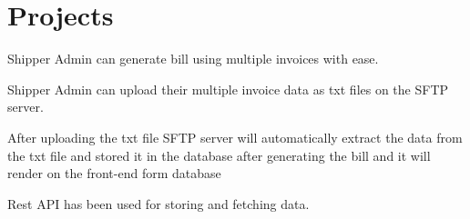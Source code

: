 \documentclass[]{deedy-resume-openfont}
\begin{document}
\begin{minipage}[t]{0.56\textwidth}

\vspace{5pt}
\section{Projects}
\begin{tightemize}
\item Shipper Admin can generate bill using multiple invoices with ease.
\end{tightemize}

\sectionsep
\begin{tightemize}
\item Shipper Admin can upload their multiple invoice data as txt files on the SFTP server.
\item After uploading the txt file SFTP server will automatically extract the data from the txt file and stored it in the database after generating the bill and it will render on the front-end form database
\item Rest API has been used for storing and fetching data.
\end{tightemize}
\sectionsep


\end{minipage}
\end{document}
